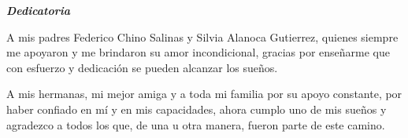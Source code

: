 \clearpage
\thispagestyle{plain}

\vspace*{0.48\textheight}

{\selectfont\bfseries\itshape
\noindent Dedicatoria\par
\vspace{1.2em}
\noindent A mis padres Federico Chino Salinas y Silvia Alanoca Gutierrez, quienes siempre me apoyaron y me brindaron su amor incondicional, gracias por enseñarme que con esfuerzo y dedicación se pueden alcanzar los sueños.\par
\vspace{1.2em}
\noindent A mis hermanas, mi mejor amiga y a toda mi familia por su apoyo constante, por haber confiado en mí y en mis capacidades, ahora cumplo uno de mis sueños y agradezco a todos los que, de una u otra manera, fueron parte de este camino.
}

\vfill
